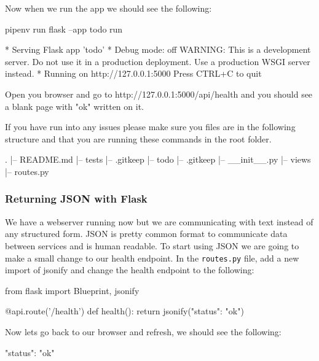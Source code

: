 \documentclass{csse4400}
\begin{document}
Now when we run the app we should see the following:

\begin{code}[language=bash,numbers=none]{}
pipenv run flask --app todo run

* Serving Flask app 'todo'
* Debug mode: off
WARNING: This is a development server. Do not use it in a production deployment. Use a production WSGI server instead.
* Running on http://127.0.0.1:5000
Press CTRL+C to quit
\end{code}

Open you browser and go to http://127.0.0.1:5000/api/health and you should see a blank page with "ok" written on it.

If you have run into any issues please make sure you files are in the following structure and that you are running these commands in the root folder.

\begin{code}[language=bash,numbers=none]{}
  .
  |-- README.md
  |-- tests
      |-- .gitkeep
  |-- todo
      |-- .gitkeep
      |-- __init__.py
      |-- views
          |-- routes.py
\end{code}

\subsubsection{Returning JSON with Flask}

We have a webserver running now but we are communicating with text instead of any structured form. JSON is pretty common format to communicate data between services and is human readable. To start using JSON we are going to make a small change to our health endpoint. In the \texttt{routes.py} file, add a new import of jsonify and change the health endpoint to the following:

\begin{code}[language=python]{}
from flask import Blueprint, jsonify
\end{code}

\begin{code}[language=python]{}
@api.route('/health')
def health():
    return jsonify({"status": "ok"})
\end{code}

Now lets go back to our browser and refresh, we should see the following:

\begin{code}[language=json,numbers=none]{}
{
  "status": "ok"
}
\end{code}
\end{document}
